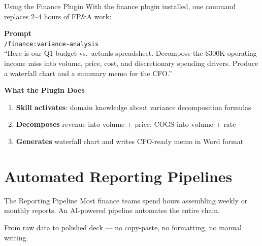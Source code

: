 \documentclass[aspectratio=169]{beamer}
\begin{document}
\begin{frame}[shrink=5]{Using the Finance Plugin}
With the finance plugin installed, one command replaces 2--4 hours of FP\&A work:
\vspace{0.2cm}

\textbf{Prompt}\\
\texttt{/finance:variance-analysis}\\[0.3em]
\small ``Here is our Q1 budget vs.\ actuals spreadsheet. Decompose the \$300K operating income miss into volume, price, cost, and discretionary spending drivers.  Produce a waterfall chart and a summary memo for the CFO.''
\normalsize
\vspace{0.2cm}

\textbf{What the Plugin Does}
\begin{enumerate}\small
  \item \textbf{Skill activates}: domain knowledge about variance decomposition formulas
  \item \textbf{Decomposes} revenue into volume + price; COGS into volume + rate
  \item \textbf{Generates} waterfall chart and writes CFO-ready memo in Word format
\end{enumerate}
\end{frame}

\section{Automated Reporting Pipelines}

\begin{frame}{The Reporting Pipeline}
Most finance teams spend hours assembling weekly or monthly reports.  An AI-powered pipeline automates the entire chain.
\vspace{0.3cm}
\begin{center}
\end{center}
\vspace{0.5cm}
From raw data to polished deck --- \alert{no copy-paste, no formatting, no manual writing.}
\end{frame}
\end{document}
